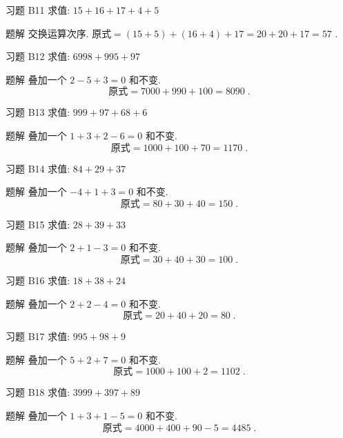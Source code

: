 \documentclass[content.tex]{subfiles}
\begin{document}
\begin{frame}{习题 B11}
求值: $15+16+17+4+5$
\begin{exampleblock}{题解}
交换运算次序. $\text{原式} = (15+5)+(16+4)+17 = 20+20+17=57$ .
\end{exampleblock}
\end{frame}

\begin{frame}{习题 B12}
求值: $6998+995+97$
\begin{exampleblock}{题解}
叠加一个 $2-5+3=0$ 和不变.
$$\text{原式} = 7000+990+100 =8090\;.$$
\end{exampleblock}
\end{frame}

\begin{frame}{习题 B13}
求值: $999+97+68+6$
\begin{exampleblock}{题解}
叠加一个 $1+3+2-6=0$ 和不变.
$$\text{原式} = 1000+100+70 = 1170\;.$$
\end{exampleblock}
\end{frame}

\begin{frame}{习题 B14}
求值: $84+29+37$
\begin{exampleblock}{题解}
叠加一个 $-4+1+3=0$ 和不变.
$$\text{原式} = 80+30+40=150\;.$$
\end{exampleblock}
\end{frame}

\begin{frame}{习题 B15}
求值: $28+39+33$
\begin{exampleblock}{题解}
叠加一个 $2+1-3=0$ 和不变.
$$\text{原式} = 30+40+30=100\;.$$
\end{exampleblock}
\end{frame}

\begin{frame}{习题 B16}
求值: $18+38+24$
\begin{exampleblock}{题解}
叠加一个 $2+2-4=0$ 和不变.
$$\text{原式} = 20+40+20=80\;.$$
\end{exampleblock}
\end{frame}

\begin{frame}{习题 B17}
求值: $995+98+9$
\begin{exampleblock}{题解}
叠加一个 $5+2+7=0$ 和不变.
$$\text{原式} = 1000+100+2=1102\;.$$
\end{exampleblock}
\end{frame}

\begin{frame}{习题 B18}
求值: $3999+397+89$
\begin{exampleblock}{题解}
叠加一个 $1+3+1-5=0$ 和不变.
$$\text{原式} = 4000+400+90-5=4485\;.$$
\end{exampleblock}
\end{frame}
\end{document}

